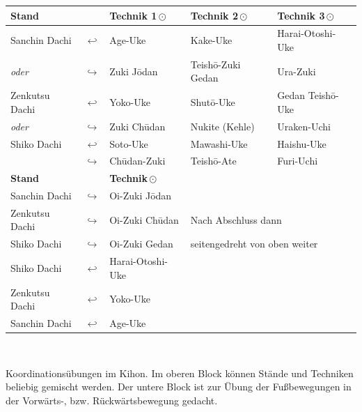 \documentclass[a5paper,landscape,DIV=calc,11pt,notitlepage]{scrartcl}
\begin{document}
\pagebreak
\begin{tcolorbox}[colback=white,colframe=GKD,coltitle=white,adjusted title=Basiskombination]
	\setlength{\tabcolsep}{3pt}		
	\null\vfill\null
	\begin{tabularx}{\textwidth}{llXXX}
		\textbf{Stand} 		& & \textbf{Technik 1\,\(\odot\)} 	& \textbf{Technik 2\,\(\odot\)} 	& \textbf{Technik 3\,\(\odot\)}\\
		\midrule
		Sanchin Dachi 		& \(\hookleftarrow\)	& Age-Uke				& Kake-Uke 				& Harai-Otoshi-Uke	\\
		\textit{oder}		& \(\hookrightarrow\) 	& Zuki J\={o}dan 		& Teish\={o}-Zuki Gedan		& Ura-Zuki			\\
		Zenkutsu Dachi		& \(\hookleftarrow\)	& Yoko-Uke 				& Shut\={o}-Uke 			& Gedan Teish\={o}-Uke	\\
		\textit{oder}		& \(\hookrightarrow\)	& Zuki Ch\={u}dan 		& Nukite (Kehle) 		& Uraken-Uchi		\\
		Shiko Dachi			& \(\hookleftarrow\)	& Soto-Uke 				& Mawashi-Uke 			& Haishu-Uke		\\
		& \(\hookrightarrow\)	& Ch\={u}dan-Zuki	& Teish\={o}-Ate 		& Furi-Uchi			\\
		\midrule
		\textbf{Stand} 		& & \textbf{Technik\,\(\odot\)} 		&  						&\\
		\midrule
		Sanchin Dachi 		& \(\hookrightarrow\)	& Oi-Zuki J\={o}dan 	&  						&\\
		Zenkutsu Dachi		& \(\hookrightarrow\)	& Oi-Zuki Ch\={u}dan 	&\multicolumn{2}{l}{Nach Abschluss dann}\\
		Shiko Dachi			& \(\hookrightarrow\)	& Oi-Zuki Gedan 		&\multicolumn{2}{l}{seitengedreht von oben weiter}\\
		Shiko Dachi			& \(\hookleftarrow\)	& Harai-Otoshi-Uke 		&  						&\\
		Zenkutsu Dachi		& \(\hookleftarrow\)	& Yoko-Uke 				&  						&\\
		Sanchin Dachi		& \(\hookleftarrow\)	& Age-Uke 				&  						&\\
	\end{tabularx}\\\null\vfill\null
	\setlength{\tabcolsep}{6pt}	
	\begin{center}
		\parbox{\textwidth-\tabcolsep}{Koordinationsübungen im Kihon. Im oberen Block  können Stände und Techniken beliebig gemischt werden. Der untere Block ist zur Übung der Fußbewegungen in der Vorwärts-, bzw. Rückwärtsbewegung gedacht.}
	\end{center}
	\null\vfill\null
\end{tcolorbox}
\end{document}
